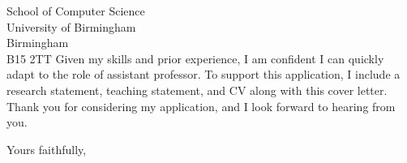 \documentclass[12pt]{letter}
\begin{document}
\begin{letter}{School of Computer Science \\ University of Birmingham \\ Birmingham \\ B15 2TT}
Given my skills and prior experience, I am confident I can quickly adapt to the role of assistant professor.
%
To support this application, I include a research statement, teaching statement, and CV along with this cover letter.
%
Thank you for considering my application, and I look forward to hearing from you.


\closing{\vspace{40pt} Yours faithfully,}
\end{letter}
\end{document}
